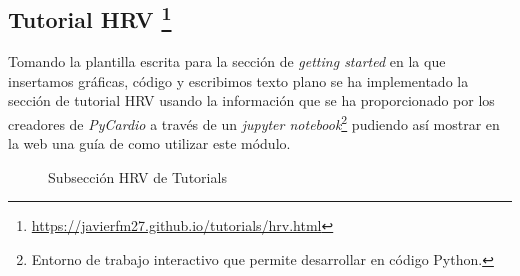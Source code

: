 \subsection[Tutorial HRV]{Tutorial HRV \footnote{\url{https://javierfm27.github.io/tutorials/hrv.html}}}
Tomando la plantilla escrita para la sección de \textit{getting started} en la que insertamos gráficas, código y escribimos texto plano se ha implementado la sección de tutorial HRV usando la información que se ha proporcionado por los creadores de \textit{PyCardio} a través de un \textit{jupyter notebook}\footnote{Entorno de trabajo interactivo que permite desarrollar en código Python.} pudiendo así mostrar en la web una guía de como utilizar este módulo. 


\begin{figure}[h!]
    \centering
    \par
    \par
    \caption{Subsección HRV de Tutorials}
    \label{fig:hrvWeb}
\end{figure}

